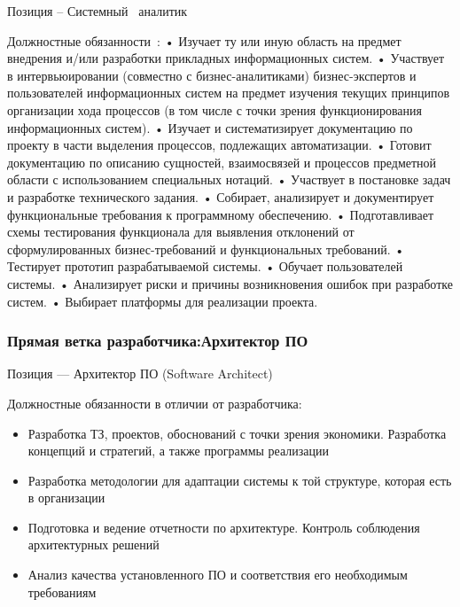 \documentclass{../industrial-development}
\begin{document}
{\lecturenotes
Позиция – Системный~\cite{hh} аналитик~\cite{itcf}

Должностные обязанности~\cite{rab}:
•	Изучает ту или иную область на предмет внедрения и/или разработки прикладных информационных систем. 
•	Участвует в интервьюировании (совместно с бизнес-аналитиками) бизнес-экспертов и пользователей информационных систем на предмет изучения текущих принципов организации хода процессов (в том числе с точки зрения функционирования информационных систем). 
•	Изучает и систематизирует документацию по проекту в части выделения процессов, подлежащих автоматизации. 
•	Готовит документацию по описанию сущностей, взаимосвязей и процессов предметной области с использованием специальных нотаций. 
•	Участвует в постановке задач и разработке технического задания. 
•	Собирает, анализирует и документирует функциональные требования к программному обеспечению. 
•	Подготавливает схемы тестирования функционала для выявления отклонений от сформулированных бизнес-требований и функциональных требований. 
•	Тестирует прототип разрабатываемой системы. 
•	 Обучает пользователей системы. 
•	Анализирует риски и причины возникновения ошибок при разработке систем. 
•	Выбирает платформы для реализации проекта. 

\begin{frame} \frametitle{Прямая ветка разработчика:Архитектор ПО}
 \begin{block}{}
  \alert{Позиция --- Архитектор ПО (Software Architect)}

Должностные обязанности в отличии от разработчика: 
  \end{block}
  \begin{itemize}
\item  Разработка ТЗ, проектов, обоснований с точки зрения экономики. Разработка концепций и стратегий, а также программы реализации
  \item Разработка методологии для адаптации системы к той структуре, которая есть в организации
  \item Подготовка и ведение отчетности по архитектуре. Контроль соблюдения архитектурных решений
 \item Анализ качества установленного ПО и соответствия его необходимым требованиям
  \end{itemize}
\end{frame}

}
\end{document}
